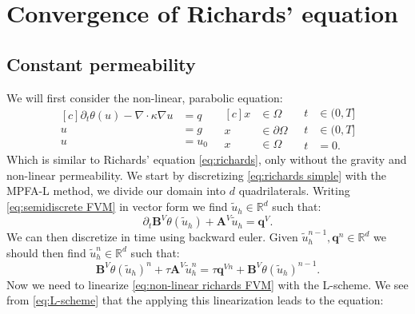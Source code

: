 \documentclass[../Main/main.tex]{subfiles}
\begin{document}
	\graphicspath{{../Time dependent equations/figs/}}
	\chapter{Convergence of Richards' equation}
	\section*{Constant permeability}
	We will first consider the non-linear, parabolic equation:
	\begin{equation}\label{eq:richards simple}
		\begin{aligned}[c]
			\partial_t \theta(u) - \nabla \cdot \kappa \nabla u &= q \\
			u &= g \\
			u &= u_0
		\end{aligned}
		\ \ \
		\begin{aligned}[c]
			x &\in \Omega  \\
			x &\in \partial \Omega \\
			x &\in \Omega  
		\end{aligned}
		\ \ \
		\begin{aligned}
			t&\in (0,T] \\
			t&\in (0,T] \\
			t&=0.
		\end{aligned}
	\end{equation}
	Which is similar to Richards' equation \eqref{eq:richards}, only without the gravity and non-linear permeability. We start by discretizing \eqref{eq:richards simple} with the MPFA-L method, we divide our domain into $d$ quadrilaterals. Writing \eqref{eq:semidiscrete FVM} in vector form we find $\tilde{u}_h \in \mathbb{R}^d$ such that:
	\begin{equation}
		\partial_t\pmb{B}^{V} \theta(\tilde{u}_h) + \pmb{A}^V \tilde{u}_h = \pmb{q}^V. 
	\end{equation}
	We can then discretize in time using backward euler. Given $ \tilde{u}_h^{n-1},\pmb{q}^n \in \mathbb{R}^d$ we should then find $ \tilde{u}_h^n \in \mathbb{R}^d$ such that: 
	\begin{equation} \label{eq:non-linear richards FVM}
		\pmb{B}^V  \theta(\tilde{u}_h)^n + \tau \pmb{A}^V \tilde{u}_h^n = \tau \pmb{q}^{Vn} + \pmb{B}^V  \theta(\tilde{u}_h)^{n-1}.
	\end{equation}
	Now we need to linearize \eqref{eq:non-linear richards FVM} with the L-scheme. We see from \eqref{eq:L-scheme} that the applying this linearization leads to the equation:
\end{document}
